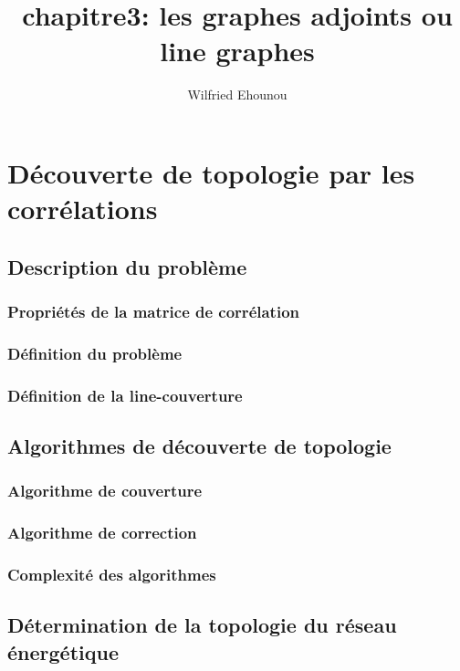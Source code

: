 \documentclass[onecolumn, 12pt]{book}
\title{chapitre3: les graphes adjoints ou line graphes}
\author{Wilfried Ehounou}
\date{\oldstylenums{\today}}
\begin{document}
\maketitle

\chapter{D\'ecouverte de topologie par les corr\'elations}
	\section{Description du probl\`eme}
		\subsection{Propri\'et\'es de la matrice de corr\'elation}
			
		\subsection{D\'efinition du probl\`eme}
			
		\subsection{D\'efinition de la line-couverture}
			
	
	\section{Algorithmes de d\'ecouverte de topologie}
		
		\subsection{Algorithme de couverture}
		\subsection{Algorithme de correction}
			
		\subsection{Complexit\'e des algorithmes}
			

	\section{D\'etermination de la topologie du r\'eseau \'energ\'etique}
		   
		
\end{document}
